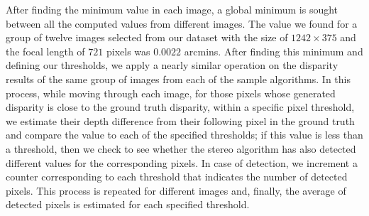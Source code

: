 After finding the minimum value in each image, a global minimum is sought between all the computed values from different images.
The value we found for a group of twelve images selected from our dataset with the size of $1242\times375$ and the focal length of $721$ 
pixels was $0.0022$ arcmins.
After finding this minimum and defining our thresholds, we apply a nearly similar operation on the disparity results of the same group of images 
from each of the sample algorithms.
In this process, while moving through each image, for those pixels whose generated disparity is close to the ground truth disparity, 
within a specific pixel threshold, 
we estimate their depth difference from their following pixel
in the ground truth and compare the value to each of the specified thresholds; if this value is less than a threshold, then we check to see whether
the stereo algorithm has also detected different values for the corresponding pixels. 
In case of detection, we increment a counter corresponding to each threshold that indicates the number of detected pixels.
This process is repeated for different images and, finally, the average of detected pixels is estimated for each specified threshold.


